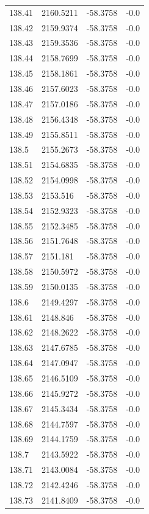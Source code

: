\begin{table}[H]
\begin{tabular}{llll}
138.41 & 2160.5211 & -58.3758 & -0.0 \\
138.42 & 2159.9374 & -58.3758 & -0.0 \\
138.43 & 2159.3536 & -58.3758 & -0.0 \\
138.44 & 2158.7699 & -58.3758 & -0.0 \\
138.45 & 2158.1861 & -58.3758 & -0.0 \\
138.46 & 2157.6023 & -58.3758 & -0.0 \\
138.47 & 2157.0186 & -58.3758 & -0.0 \\
138.48 & 2156.4348 & -58.3758 & -0.0 \\
138.49 & 2155.8511 & -58.3758 & -0.0 \\
138.5 & 2155.2673 & -58.3758 & -0.0 \\
138.51 & 2154.6835 & -58.3758 & -0.0 \\
138.52 & 2154.0998 & -58.3758 & -0.0 \\
138.53 & 2153.516 & -58.3758 & -0.0 \\
138.54 & 2152.9323 & -58.3758 & -0.0 \\
138.55 & 2152.3485 & -58.3758 & -0.0 \\
138.56 & 2151.7648 & -58.3758 & -0.0 \\
138.57 & 2151.181 & -58.3758 & -0.0 \\
138.58 & 2150.5972 & -58.3758 & -0.0 \\
138.59 & 2150.0135 & -58.3758 & -0.0 \\
138.6 & 2149.4297 & -58.3758 & -0.0 \\
138.61 & 2148.846 & -58.3758 & -0.0 \\
138.62 & 2148.2622 & -58.3758 & -0.0 \\
138.63 & 2147.6785 & -58.3758 & -0.0 \\
138.64 & 2147.0947 & -58.3758 & -0.0 \\
138.65 & 2146.5109 & -58.3758 & -0.0 \\
138.66 & 2145.9272 & -58.3758 & -0.0 \\
138.67 & 2145.3434 & -58.3758 & -0.0 \\
138.68 & 2144.7597 & -58.3758 & -0.0 \\
138.69 & 2144.1759 & -58.3758 & -0.0 \\
138.7 & 2143.5922 & -58.3758 & -0.0 \\
138.71 & 2143.0084 & -58.3758 & -0.0 \\
138.72 & 2142.4246 & -58.3758 & -0.0 \\
138.73 & 2141.8409 & -58.3758 & -0.0 \\

\end{tabular}
\end{table}
